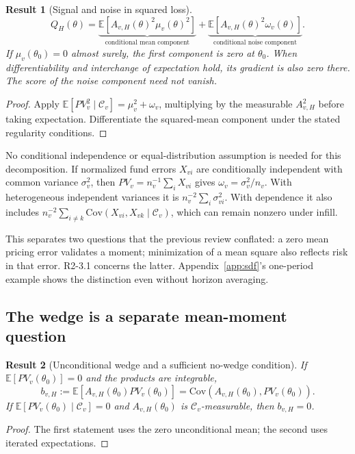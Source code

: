 \documentclass[11pt]{article}
\newcommand{\E}{\mathbb{E}}
\newcommand{\Cov}{\mathrm{Cov}}
\theoremstyle{plain}
\newtheorem{result}{Result}[section]
\theoremstyle{definition}
\begin{document}
\begin{result}[Signal and noise in squared loss]
\label{res:vardecomp}
\begin{equation}
\label{eq:decomp}
Q_H(\theta)
=\underbrace{\E[A_{v,H}(\theta)^2\mu_v(\theta)^2]}_{\text{conditional mean component}}
+\underbrace{\E[A_{v,H}(\theta)^2\omega_v(\theta)]}_{\text{conditional noise component}}.
\end{equation}
If $\mu_v(\theta_0)=0$ almost surely, the first component is zero at $\theta_0$. When differentiability and interchange of expectation hold, its gradient is also zero there. The score of the noise component need not vanish.
\end{result}
\begin{proof}
Apply $\E[PV_v^2\mid\mathcal C_v]=\mu_v^2+\omega_v$, multiplying by the measurable $A_{v,H}^2$ before taking expectation. Differentiate the squared-mean component under the stated regularity conditions.
\end{proof}

No conditional independence or equal-distribution assumption is needed for this decomposition. If normalized fund errors $X_{vi}$ are conditionally independent with common variance $\sigma_v^2$, then $PV_v=n_v^{-1}\sum_iX_{vi}$ gives $\omega_v=\sigma_v^2/n_v$. With heterogeneous independent variances it is $n_v^{-2}\sum_i\sigma_{vi}^2$. With dependence it also includes $n_v^{-2}\sum_{i\ne k}\Cov(X_{vi},X_{vk}\mid\mathcal C_v)$, which can remain nonzero under infill.

This separates two questions that the previous review conflated: a zero mean pricing error validates a moment; minimization of a mean square also reflects risk in that error. R2-3.1 concerns the latter. Appendix~\ref{app:sdf}'s one-period example shows the distinction even without horizon averaging.

\subsection{The wedge is a separate mean-moment question}

\begin{result}[Unconditional wedge and a sufficient no-wedge condition]
\label{res:wedgechar}
If $\E[PV_v(\theta_0)]=0$ and the products are integrable,
\[
b_{v,H}:=\E[A_{v,H}(\theta_0)PV_v(\theta_0)]
=\Cov(A_{v,H}(\theta_0),PV_v(\theta_0)).
\]
If $\E[PV_v(\theta_0)\mid\mathcal C_v]=0$ and $A_{v,H}(\theta_0)$ is $\mathcal C_v$-measurable, then $b_{v,H}=0$.
\end{result}
\begin{proof}
The first statement uses the zero unconditional mean; the second uses iterated expectations.
\end{proof}
\end{document}
